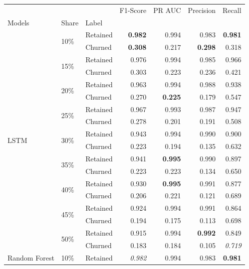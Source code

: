 \documentclass{kththesis}
\begin{document}
\begin{table}
\centering
\begin{tabular}{lllrrrr}
\toprule
     &     &          &  F1-Score &    PR AUC &  Precision &    Recall \\
Models & Share & Label &           &           &            &           \\
\midrule
\multirow{18}{*}{LSTM} & \multirow{2}{*}{10\%} & Retained &  \textbf{0.982} &  0.994 &   0.983 &  \textbf{0.981} \\
     &     & Churned &  \textbf{0.308} &  0.217 &   \textbf{0.298} &  0.318 \\
\cline{2-7}
     & \multirow{2}{*}{15\%} & Retained &  0.976 &  0.994 &   0.985 &  0.966 \\
     &     & Churned &  0.303 &  0.223 &   0.236 &  0.421 \\
\cline{2-7}
     & \multirow{2}{*}{20\%} & Retained &  0.963 &  0.994 &   0.988 &  0.938 \\
     &     & Churned &  0.270 &  \textbf{0.225} &   0.179 &  0.547 \\
\cline{2-7}
     & \multirow{2}{*}{25\%} & Retained &  0.967 &  0.993 &   0.987 &  0.947 \\
     &     & Churned &  0.278 &  0.201 &   0.191 &  0.508 \\
\cline{2-7}
     & \multirow{2}{*}{30\%} & Retained &  0.943 &  0.994 &   0.990 &  0.900 \\
     &     & Churned &  0.223 &  0.194 &   0.135 &  0.632 \\
\cline{2-7}
     & \multirow{2}{*}{35\%} & Retained &  0.941 &  \textbf{0.995} &   0.990 &  0.897 \\
     &     & Churned &  0.223 &  0.223 &   0.134 &  0.650 \\
\cline{2-7}
     & \multirow{2}{*}{40\%} & Retained &  0.930 &  \textbf{0.995} &   0.991 &  0.877 \\
     &     & Churned &  0.206 &  0.221 &   0.121 &  0.689 \\
\cline{2-7}
     & \multirow{2}{*}{45\%} & Retained &  0.924 &  0.994 &   0.991 &  0.864 \\
     &     & Churned &  0.194 &  0.175 &   0.113 &  0.698 \\
\cline{2-7}
     & \multirow{2}{*}{50\%} & Retained &  0.915 &  0.994 &   \textbf{0.992} &  0.849 \\
     &     & Churned &  0.183 &  0.184 &   0.105 &  \textit{0.719} \\
\cline{1-7}
\cline{2-7}
\multirow{18}{*}{Random Forest} & \multirow{2}{*}{10\%} & Retained &  \textit{0.982} &  0.994 &   0.983 &  \textbf{0.981} \\

\end{tabular}
\end{table}
\end{document}
